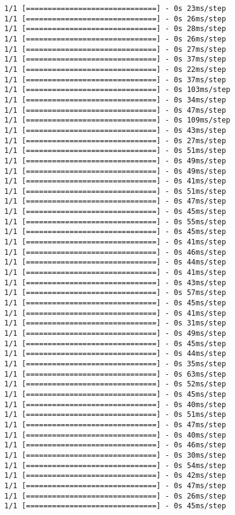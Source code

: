 \documentclass[11pt]{article}
\begin{document}
\begin{Verbatim}[commandchars=\\\{\}]
1/1 [==============================] - 0s 23ms/step
1/1 [==============================] - 0s 26ms/step
1/1 [==============================] - 0s 28ms/step
1/1 [==============================] - 0s 26ms/step
1/1 [==============================] - 0s 27ms/step
1/1 [==============================] - 0s 37ms/step
1/1 [==============================] - 0s 22ms/step
1/1 [==============================] - 0s 37ms/step
1/1 [==============================] - 0s 103ms/step
1/1 [==============================] - 0s 34ms/step
1/1 [==============================] - 0s 47ms/step
1/1 [==============================] - 0s 109ms/step
1/1 [==============================] - 0s 43ms/step
1/1 [==============================] - 0s 27ms/step
1/1 [==============================] - 0s 51ms/step
1/1 [==============================] - 0s 49ms/step
1/1 [==============================] - 0s 49ms/step
1/1 [==============================] - 0s 41ms/step
1/1 [==============================] - 0s 51ms/step
1/1 [==============================] - 0s 47ms/step
1/1 [==============================] - 0s 45ms/step
1/1 [==============================] - 0s 55ms/step
1/1 [==============================] - 0s 45ms/step
1/1 [==============================] - 0s 41ms/step
1/1 [==============================] - 0s 46ms/step
1/1 [==============================] - 0s 44ms/step
1/1 [==============================] - 0s 41ms/step
1/1 [==============================] - 0s 43ms/step
1/1 [==============================] - 0s 57ms/step
1/1 [==============================] - 0s 45ms/step
1/1 [==============================] - 0s 41ms/step
1/1 [==============================] - 0s 31ms/step
1/1 [==============================] - 0s 49ms/step
1/1 [==============================] - 0s 45ms/step
1/1 [==============================] - 0s 44ms/step
1/1 [==============================] - 0s 35ms/step
1/1 [==============================] - 0s 63ms/step
1/1 [==============================] - 0s 52ms/step
1/1 [==============================] - 0s 45ms/step
1/1 [==============================] - 0s 40ms/step
1/1 [==============================] - 0s 51ms/step
1/1 [==============================] - 0s 47ms/step
1/1 [==============================] - 0s 40ms/step
1/1 [==============================] - 0s 46ms/step
1/1 [==============================] - 0s 30ms/step
1/1 [==============================] - 0s 54ms/step
1/1 [==============================] - 0s 42ms/step
1/1 [==============================] - 0s 47ms/step
1/1 [==============================] - 0s 26ms/step
1/1 [==============================] - 0s 45ms/step

\end{Verbatim}
\end{document}
